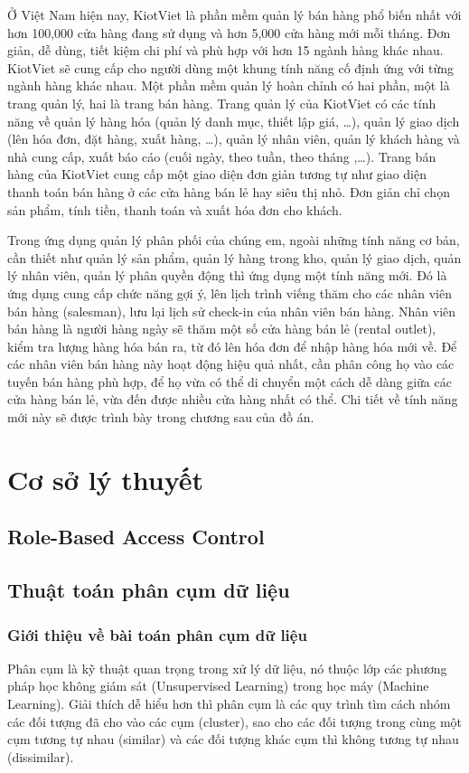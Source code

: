 Ở Việt Nam hiện nay, KiotViet là phần mềm quản lý bán hàng phổ biến
nhất với hơn 100,000 cửa hàng đang sử dụng và hơn 5,000 cửa hàng mới
mỗi tháng. Đơn giản, dễ dùng, tiết kiệm chi phí và phù hợp với hơn
15 ngành hàng khác nhau. KiotViet sẽ cung cấp cho người dùng một khung
tính năng cố định ứng với từng ngành hàng khác nhau. Một phần mềm
quản lý hoàn chỉnh có hai phần, một là trang quản lý, hai là trang
bán hàng. Trang quản lý của KiotViet có các tính năng về quản lý hàng
hóa (quản lý danh mục, thiết lập giá, …), quản lý giao dịch (lên hóa đơn,
đặt hàng, xuất hàng, …), quản lý nhân viên, quản lý khách hàng và
nhà cung cấp, xuất báo cáo (cuối ngày, theo tuần, theo tháng ,…).
Trang bán hàng của KiotViet cung cấp một giao diện đơn giản tương tự
như giao diện thanh toán bán hàng ở các cửa hàng bán lẻ hay
siêu thị nhỏ. Đơn giản chỉ chọn sản phẩm, tính tiền, thanh toán
và xuất hóa đơn cho khách.

Trong ứng dụng quản lý phân phối của chúng em, ngoài những tính
năng cơ bản, cần thiết như quản lý sản phẩm, quản lý hàng trong kho,
quản lý giao dịch, quản lý nhân viên, quản lý phân quyền động thì ứng
dụng một tính năng mới. Đó là ứng dụng cung cấp chức năng gợi ý,
lên lịch trình viếng thăm cho các nhân viên bán hàng (salesman), lưu
lại lịch sử check-in của nhân viên bán hàng. Nhân viên bán hàng
là người hàng ngày sẽ thăm một số cửa hàng bán lẻ (rental outlet),
kiểm tra lượng hàng hóa bán ra, từ đó lên hóa đơn để nhập hàng hóa
mới về. Để các nhân viên bán hàng này hoạt động hiệu quả nhất, cần
phân công họ vào các tuyến bán hàng phù hợp, để họ vừa có thể di chuyển
một cách dễ dàng giữa các cửa hàng bán lẻ, vừa đến được nhiều cửa
hàng nhất có thể. Chi tiết về tính năng mới này sẽ được trình bày
trong chương sau của đồ án.

\section{Cơ sở lý thuyết}
\subsection{Role-Based Access Control}
\subsection{Thuật toán phân cụm dữ liệu}
\subsubsection{Giới thiệu về bài toán phân cụm dữ liệu}
Phân cụm là kỹ thuật quan trọng trong xử lý dữ liệu, nó thuộc lớp
các phương pháp học không giám sát (Unsupervised Learning) trong học
máy (Machine Learning). Giải thích dễ hiểu hơn thì phân cụm là
các quy trình tìm cách nhóm các đối tượng đã cho vào các cụm (cluster),
sao cho các đối tượng trong cùng một cụm tương tự nhau (similar) và
các đối tượng khác cụm thì không tương tự nhau (dissimilar).

